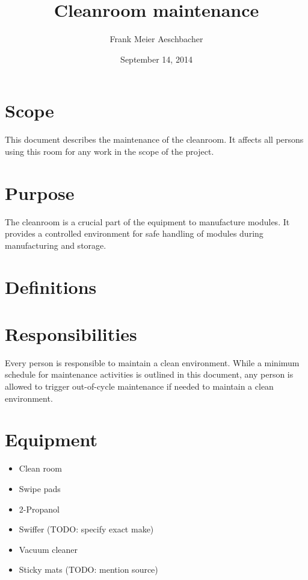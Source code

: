 \documentclass[12pt]{unlsilabsop}
\title{Cleanroom maintenance}
\date{September 14, 2014}
\author{Frank Meier Aeschbacher}
\begin{document}
\maketitle

\section{Scope}
This document describes the maintenance of the cleanroom. It affects all persons using this room for any work in the scope of the project.

\section{Purpose}
The cleanroom is a crucial part of the equipment to manufacture modules. It provides a controlled environment for safe handling of modules during manufacturing and storage.

\section{Definitions}

\section{Responsibilities}
Every person is responsible to maintain a clean environment. While a minimum schedule for maintenance activities is outlined in this document, any person is allowed to trigger out-of-cycle maintenance if needed to maintain a clean environment.

\section{Equipment}

\begin{itemize}
    \item Clean room
    \item Swipe pads
    \item 2-Propanol
    \item Swiffer (TODO: specify exact make)
    \item Vacuum cleaner
    \item Sticky mats (TODO: mention source)
\end{itemize}
\end{document}

